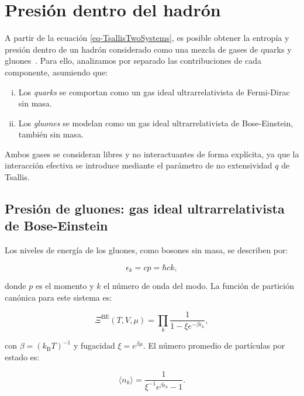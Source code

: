 \section{Presión dentro del hadrón}
\label{sec-PresTsa}

A partir de la ecuación \eqref{eq-TsallisTwoSystems}, es posible obtener la entropía y presión dentro de un hadrón considerado como una mezcla de gases de quarks y gluones \cite{Greiner2001}. Para ello, analizamos por separado las contribuciones de cada componente, asumiendo que:

\begin{enumerate}[i.]
    \item Los \emph{quarks} se comportan como un gas ideal ultrarrelativista de Fermi-Dirac sin masa.
    \item Los \emph{gluones} se modelan como un gas ideal ultrarrelativista de Bose-Einstein, también sin masa.
\end{enumerate}

Ambos gases se consideran libres y no interactuantes de forma explícita, ya que la interacción efectiva se introduce mediante el parámetro de no extensividad \( q \) de Tsallis.

\subsection{Presión de gluones: gas ideal ultrarrelativista de Bose-Einstein}

Los niveles de energía de los gluones, como bosones sin masa, se describen por:

\begin{equation}
\epsilon_k = c p = \hbar c k,
\end{equation}

donde \( p \) es el momento y \( k \) el número de onda del modo. La función de partición canónica para este sistema es:

\begin{equation}\label{eq-partfunc}
\Xi^{\mathrm{BE}}(T,V,\mu) = \prod_k \frac{1}{1 - \xi e^{-\beta \epsilon_k}},
\end{equation}

con \( \beta = (k_{\mathrm{B}} T)^{-1} \) y fugacidad \( \xi = e^{\beta \mu} \). El número promedio de partículas por estado es:

\begin{equation}
\langle n_k \rangle = \frac{1}{\xi^{-1} e^{\beta \epsilon_k} - 1}.
\end{equation}

